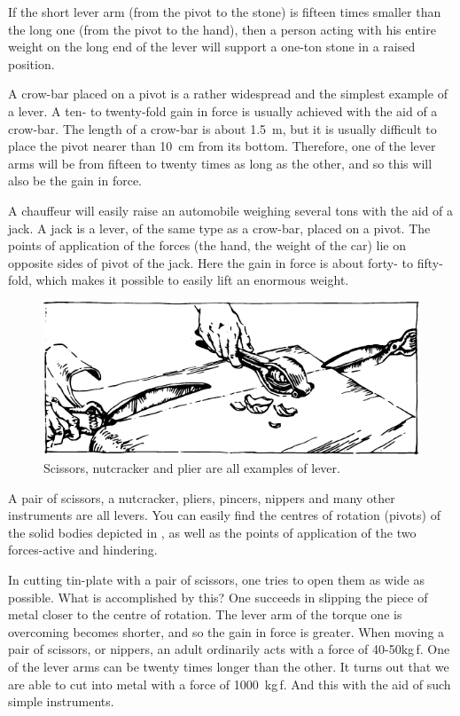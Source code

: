 If the short lever arm (from the pivot to the stone) is
fifteen times smaller than the long one (from the pivot
to the hand), then a person acting with his entire weight
on the long end of the lever will support a one-ton stone
in a raised position.

A crow-bar placed on a pivot is a rather widespread and the simplest example of a lever. A ten- to twenty-fold gain in force is usually achieved with the aid of a crow-bar. The length of a crow-bar is about \SI{1.5}{\meter}, but it is usually difficult to place the pivot nearer than \SI{10}{\centi\meter} from its bottom. Therefore, one of the lever arms will be from fifteen to twenty times as long as the other, and so this will also be the gain in force.

A chauffeur will easily raise an automobile weighing several tons with the aid of a jack. A jack is a lever, of the same type as a crow-bar, placed on a pivot. The points of application of the forces (the hand, the weight of the car) lie on opposite sides of pivot of the jack. Here the gain in force is about forty- to fifty-fold, which makes it possible to easily lift an enormous weight.

 \begin{figure}[!ht]
 \centering
 \includegraphics[width=\textwidth]{figures/fig-5-03.pdf}
 \caption{Scissors, nutcracker and plier are all examples of lever.}
 \label{fig-5-03}
 \end{figure}


A pair of scissors, a nutcracker, pliers, pincers, nippers and many other instruments are all levers. You can easily find the centres of rotation (pivots) of the solid bodies depicted in , as well as the points of application of the two forces-active and hindering.

In cutting tin-plate with a pair of scissors, one tries to open them as wide as possible. What is accomplished by this? One succeeds in slipping the piece of metal closer to the centre of rotation. The lever arm of the torque one is overcoming becomes shorter, and so the gain in force is greater. When moving a pair of scissors, or nippers, an adult ordinarily acts with a force of 40-50\si{\kilo\gram}\,f. One of the lever arms can be twenty times longer than the other. It turns out that we are able to cut into metal with a force of \SI{1000}{\kilo\gram}\,f. And this with the aid of such simple instruments.

